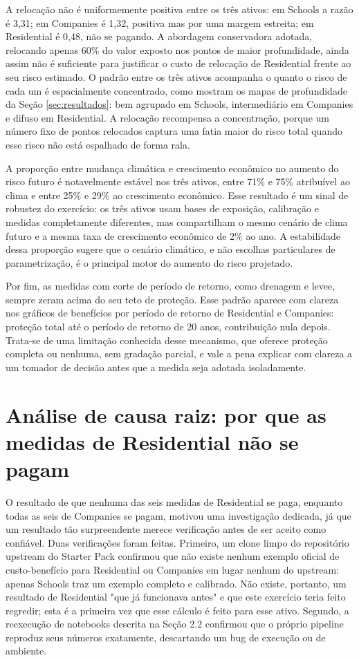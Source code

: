 \documentclass[11pt]{article}
\begin{document}
A relocação não é uniformemente positiva entre os três ativos: em Schools a razão é 3,31;
em Companies é 1,32, positiva mas por uma margem estreita; em Residential é 0,48, não se
pagando. A abordagem conservadora adotada, relocando apenas 60\% do valor exposto nos
pontos de maior profundidade, ainda assim não é suficiente para justificar o custo de
relocação de Residential frente ao seu risco estimado. O padrão entre os três ativos
acompanha o quanto o risco de cada um é espacialmente concentrado, como mostram os mapas de
profundidade da Seção \ref{sec:resultados}: bem agrupado em Schools, intermediário em
Companies e difuso em Residential. A relocação recompensa a concentração, porque um número
fixo de pontos relocados captura uma fatia maior do risco total quando esse risco não está
espalhado de forma rala.

A proporção entre mudança climática e crescimento econômico no aumento do risco futuro é
notavelmente estável nos três ativos, entre 71\% e 75\% atribuível ao clima e entre 25\% e
29\% ao crescimento econômico. Esse resultado é um sinal de robustez do exercício: os três
ativos usam bases de exposição, calibração e medidas completamente diferentes, mas
compartilham o mesmo cenário de clima futuro e a mesma taxa de crescimento econômico de 2\%
ao ano. A estabilidade dessa proporção sugere que o cenário climático, e não escolhas
particulares de parametrização, é o principal motor do aumento do risco projetado.

Por fim, as medidas com corte de período de retorno, como drenagem e levee, sempre zeram
acima do seu teto de proteção. Esse padrão aparece com clareza nos gráficos de benefícios
por período de retorno de Residential e Companies: proteção total até o período de retorno
de 20 anos, contribuição nula depois. Trata-se de uma limitação conhecida desse mecanismo,
que oferece proteção completa ou nenhuma, sem gradação parcial, e vale a pena explicar com
clareza a um tomador de decisão antes que a medida seja adotada isoladamente.

\section{Análise de causa raiz: por que as medidas de Residential não se pagam}
\label{sec:causa-raiz}

O resultado de que nenhuma das seis medidas de Residential se paga, enquanto todas as seis
de Companies se pagam, motivou uma investigação dedicada, já que um resultado tão
surpreendente merece verificação antes de ser aceito como confiável. Duas verificações
foram feitas. Primeiro, um clone limpo do repositório upstream do Starter Pack confirmou
que não existe nenhum exemplo oficial de custo-benefício para Residential ou Companies em
lugar nenhum do upstream: apenas Schools traz um exemplo completo e calibrado. Não existe,
portanto, um resultado de Residential "que já funcionava antes" e que este exercício
teria feito regredir; esta é a primeira vez que esse cálculo é feito para esse ativo.
Segundo, a reexecução de notebooks descrita na Seção 2.2 confirmou que o próprio pipeline
reproduz seus números exatamente, descartando um bug de execução ou de ambiente.
\end{document}
